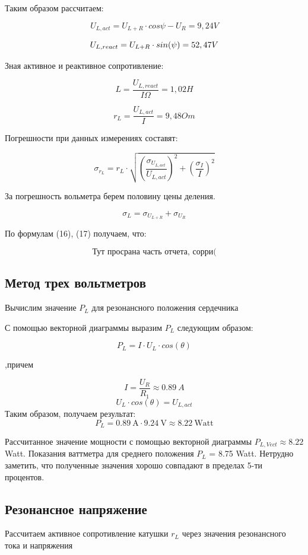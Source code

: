 Таким образом рассчитаем:

$$
U_{L,act} = {U_{L+R}}\cdot {cos\psi} - U_R = 9,24 V
$$

$$
U_{L,react} = U_{L+R}\cdot sin(\psi) = 52,47 \vspace{0.2cm} V
$$

Зная активное и реактивное сопротивление:

$$
L = \frac{U_{L,react}}{{I}{\Omega}} = 1,02 H
$$

$$
r_L = \frac{U_{L,act}}{I} = 9,48 Om
$$

Погрешности при данных измерениях составят:

\begin{equation}\label{}
\sigma_{r_L} = r_L \cdot \sqrt{(\frac{\sigma_{U_{L,act}}}{U_{L, act}})^2 + (\frac{\sigma_I}{I})^2}
\end{equation}

За погрешность вольметра берем половину цены деления.

\begin{equation}\label{}
\sigma_{L} = \sigma_{U_{L+R}} + \sigma_{U_R}
\end{equation}

По формулам (16), (17) получаем, что:

\[ \textbf{Тут просрана часть отчета, сорри(} \]

\subsection{Метод трех вольтметров} 
Вычислим значение $ P_{L} $ для резонансного положения сердечника 

С помощью векторной диаграммы выразим $P_L$ следующим образом:

$$
P_L = I\cdot U_L\cdot cos(\theta)
$$

,причем

$$
I = \frac{U_R}{R_1} \approx 0.89 \: A
$$
$$
U_L\cdot cos(\theta) = U_{L, act}
$$
Таким образом, получаем результат:
$$
P_{L} = 0.89 \: \text{A} \cdot 9.24 \: \text{V} \approx 8.22 \: \text{Watt}
$$

Рассчитанное значение мощности с помощью векторной диаграммы $P_{L,Vect} \approx 8.22$  Watt.
\newline
Показания ваттметра для среднего положения $P_{L}$ = 8.75 Watt. Нетрудно заметить, что полученные значения хорошо совпадают в пределах 5-ти процентов.

\subsection{Резонансное напряжение}
Рассчитаем активное сопротивление катушки $ r_{L}$ через значения резонансного тока и напряжения

